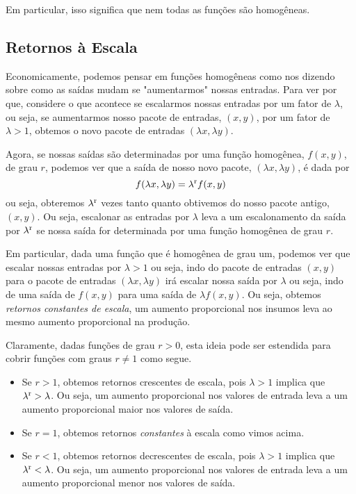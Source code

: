 \documentclass[a4paper]{article}
\begin{document}
\par Em particular, isso significa que nem todas as funções são homogêneas.
\subsection*{Retornos à Escala}
Economicamente, podemos pensar em funções homogêneas como nos dizendo sobre como as saídas mudam se "aumentarmos" nossas entradas. Para ver por que, considere o que acontece se escalarmos nossas entradas por um fator de $\lambda$, ou seja, se aumentarmos nosso pacote de entradas, $(x,y)$, por um fator de $\lambda > 1$, obtemos o novo pacote de entradas $(\lambda x ,\lambda y)$.

Agora, se nossas saídas são determinadas por uma função homogênea, $f(x,y)$, de grau $r$, podemos ver que a saída de nosso novo pacote, $(\lambda x,\lambda y)$, é dada por
\begin{equation}
    f(\lambda x,\lambda y) = \lambda\textsuperscript{r}f(x,y)
\end{equation}
ou seja, obteremos $\lambda\textsuperscript{r}$ vezes tanto quanto obtivemos do nosso pacote antigo, $(x,y)$. Ou seja, escalonar as entradas por $\lambda$ leva a um escalonamento da saída por $\lambda\textsuperscript{r}$ se nossa saída for determinada por uma função homogênea de grau $r$.

\par Em particular, dada uma função que é homogênea de grau um, podemos ver que escalar nossas entradas por $\lambda > 1$  ou seja, indo do pacote de entradas $(x,y)$ para o pacote de entradas $(\lambda x,\lambda y)$ irá escalar nossa saída por $\lambda$ ou seja, indo de uma saída de $f(x,y)$ para uma saída de $\lambda f(x,y)$. Ou seja, obtemos \textit{retornos constantes de escala}, um aumento proporcional nos insumos leva ao mesmo aumento proporcional na produção.

\par Claramente, dadas funções de grau $r > 0$, esta ideia pode ser estendida para cobrir funções com graus $r \neq 1$ como segue.
\begin{itemize}
    \item Se $r > 1$, obtemos retornos crescentes de escala, pois $\lambda > 1$ implica que $\lambda\textsuperscript{r} > \lambda$. Ou seja, um aumento proporcional nos valores de entrada leva a um aumento proporcional maior nos valores de saída.
    \item Se $r = 1$, obtemos retornos \textit{constantes} à escala como vimos acima.
    \item Se $r < 1$, obtemos retornos decrescentes de escala, pois $\lambda > 1$ implica que $\lambda\textsuperscript{r} < \lambda$. Ou seja, um aumento proporcional nos valores de entrada leva a um aumento proporcional menor nos valores de saída.
\end{itemize}
\end{document}
